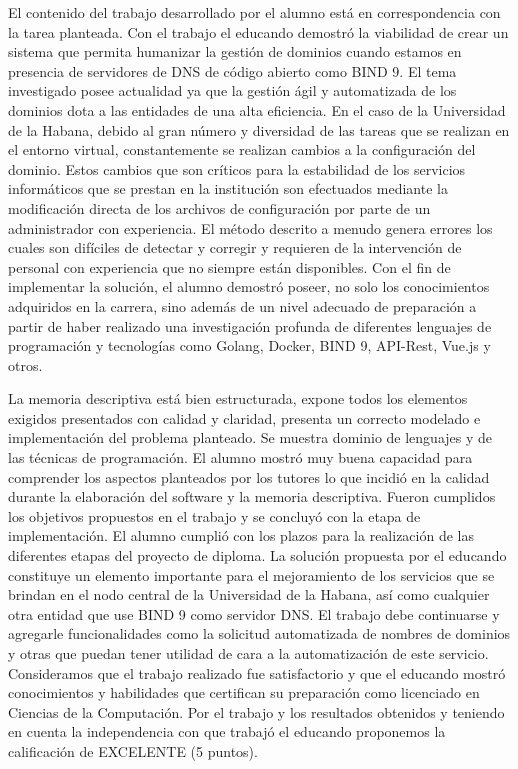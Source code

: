 \begin{opinion}
El contenido del trabajo desarrollado por el alumno está en correspondencia con la tarea planteada. Con el trabajo el educando demostró la viabilidad de crear un sistema que permita humanizar la gestión de dominios cuando estamos en presencia de servidores de DNS de código abierto como BIND 9. El tema investigado posee actualidad ya que la gestión ágil y automatizada de los dominios dota a las entidades de una alta eficiencia. En el caso de la Universidad de la Habana, debido al gran número y diversidad de las tareas que se realizan en el entorno virtual, constantemente se realizan cambios a la configuración del dominio. Estos cambios que son críticos para la estabilidad de los servicios informáticos que se prestan en la institución son efectuados mediante la modificación directa de los archivos de configuración por parte de un administrador con experiencia. El método descrito a menudo genera errores los cuales son difíciles de detectar y corregir y requieren de la intervención de personal con experiencia que no siempre están disponibles.
Con el fin de implementar la solución, el alumno demostró poseer, no solo los conocimientos adquiridos en la carrera, sino además de un nivel adecuado de preparación a partir de haber realizado una investigación profunda de diferentes lenguajes de programación y tecnologías como Golang, Docker, BIND 9, API-Rest, Vue.js y otros.

La memoria descriptiva está bien estructurada, expone todos los elementos exigidos presentados con calidad y claridad, presenta un correcto modelado e implementación del problema planteado. Se muestra dominio de lenguajes y de las técnicas de programación. El alumno mostró muy buena capacidad para comprender los aspectos planteados por los tutores lo que incidió en la calidad durante la elaboración del software y la memoria descriptiva. Fueron cumplidos los objetivos propuestos en el trabajo y se concluyó con la etapa de implementación. El alumno cumplió con los plazos para la realización de las diferentes etapas del proyecto de diploma.
La solución propuesta por el educando constituye un elemento importante para el mejoramiento de los servicios que se brindan en el nodo central de la Universidad de la Habana, así como cualquier otra entidad que use BIND 9 como servidor DNS. El trabajo debe continuarse y agregarle funcionalidades como la solicitud automatizada de nombres de dominios y otras que puedan tener utilidad de cara a la automatización de este servicio.
Consideramos que el trabajo realizado fue satisfactorio y que el educando mostró conocimientos y habilidades que certifican su preparación como licenciado en Ciencias de la Computación. 
Por el trabajo y los resultados obtenidos y teniendo en cuenta la independencia con que trabajó el educando proponemos la calificación de EXCELENTE (5 puntos).
\end{opinion}